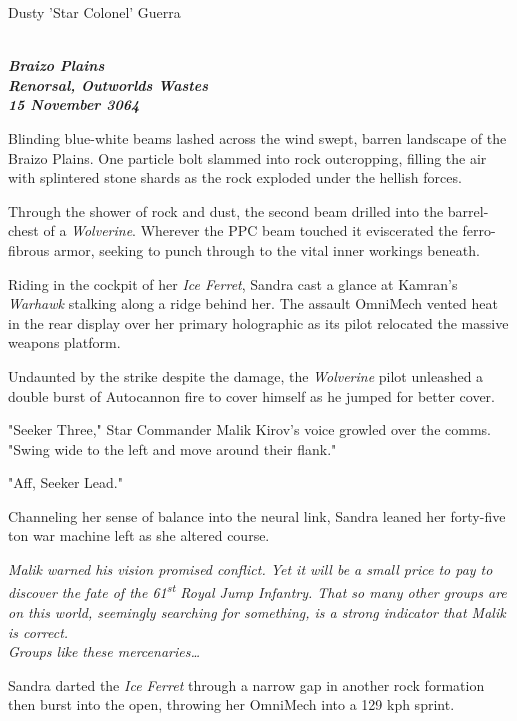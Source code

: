 \begin{center}
Dusty 'Star Colonel' Guerra
\end{center}

\begin{multicols}{2}

\emph{
\bfseries
\\Braizo Plains\\
\noindent
Renorsal, Outworlds Wastes\\
15 November 3064
}

Blinding blue-white beams lashed across the wind swept, barren landscape of the Braizo Plains.
One particle bolt slammed into rock outcropping, filling the air with splintered stone shards as the rock exploded under the hellish forces.

Through the shower of rock and dust, the second beam drilled into the barrel-chest of a \emph{Wolverine}.
Wherever the PPC beam touched it eviscerated the ferro-fibrous armor, seeking to punch through to the vital inner workings beneath.

Riding in the cockpit of her \emph{Ice Ferret}, Sandra cast a glance at Kamran's \emph{Warhawk} stalking along a ridge behind her.
The assault OmniMech vented heat in the rear display over her primary holographic as its pilot relocated the massive weapons platform.

Undaunted by the strike despite the damage, the \emph{Wolverine} pilot unleashed a double burst of Autocannon fire to cover himself as he jumped for better cover.

"Seeker Three," Star Commander Malik Kirov's voice growled over the comms. "Swing wide to the left and move around their flank."

"Aff, Seeker Lead."

Channeling her sense of balance into the neural link, Sandra leaned her forty-five ton war machine left as she altered course.

\emph{
Malik warned his vision promised conflict.
Yet it will be a small price to pay to discover the fate of the 61\textsuperscript{st} Royal Jump Infantry.
That so many other groups are on this world, seemingly searching for something, is a strong indicator that Malik is correct.\\
Groups like these mercenaries{\ldots}
}

Sandra darted the \emph{Ice Ferret} through a narrow gap in another rock formation then burst into the open, throwing her OmniMech into a 129 kph sprint. 


\end{multicols}
